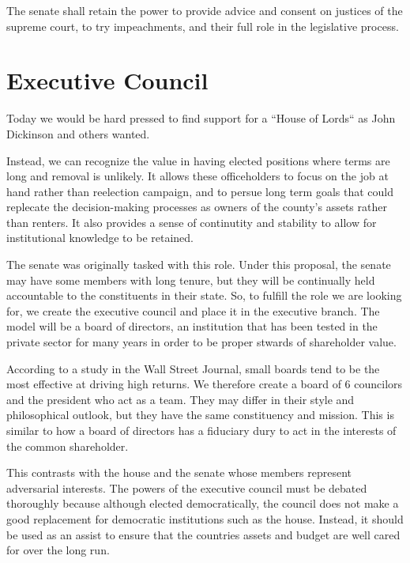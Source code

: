 \documentclass{article}
\begin{document}
\begin{quoting}
The senate shall retain the power to provide advice and consent on justices of the supreme court, to try impeachments, and their full role in the legislative process.
\end{quoting}

\section{Executive Council}

Today we would be hard pressed to find support for a “House of Lords“ as John Dickinson and others wanted.

Instead, we can recognize the value in having elected positions where terms are long and removal is unlikely. It allows these officeholders to focus on the job at hand rather than reelection campaign, and to persue long term goals that could replecate the decision-making processes as owners of the county's assets rather than renters. It also provides a sense of continutity and stability to allow for institutional knowledge to be retained.

The senate was originally tasked with this role. Under this proposal, the senate may have some members with long tenure, but they will be continually held accountable to the constituents in their state. So, to fulfill the role we are looking for, we create the executive council and place it in the executive branch. The model will be a board of directors, an institution that has been tested in the private sector for many years in order to be proper stwards of shareholder value.

According to a study in the Wall Street Journal, small boards tend to be the most effective at driving high returns\cite{Lublin}. We therefore create a board of 6 councilors and the president who act as a team. They may differ in their style and philosophical outlook, but they have the same constituency and mission. This is similar to how a board of directors has a fiduciary dury to act in the interests of the common shareholder.

This contrasts with the house and the senate whose members represent adversarial interests. The powers of the executive council must be debated thoroughly because although elected democratically, the council does not make a good replacement for democratic institutions such as the house. Instead, it should be used as an assist to ensure that the countries assets and budget are well cared for over the long run.
\end{document}
